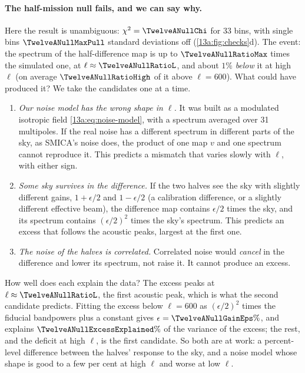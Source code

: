 \paragraph{The half-mission null fails, and we can say why.} Here the result is unambiguous: $\chi^2=\TwelveANullChi$
for $33$ bins, with single bins $\TwelveANullMaxPull$ standard deviations off (\cref{13a:fig:checks}d). The event: the
spectrum of the half-difference map is up to $\TwelveANullRatioMax$ times the simulated one, at $\ell\approx\TwelveANullRatioL$,
and about $1\%$ \emph{below} it at high $\ell$ (on average $\TwelveANullRatioHigh$ of it above $\ell=600$). What could have
produced it? We take the candidates one at a time.
\begin{enumerate}[itemsep=2pt,leftmargin=1.5em]
  \item \emph{Our noise model has the wrong shape in $\ell$.} It was built as a modulated isotropic field
        \eqref{13a:eq:noise-model}, with a spectrum averaged over 31 multipoles. If the real noise has a different spectrum in
        different parts of the sky, as SMICA's noise does, the product of one map $v$ and one spectrum cannot reproduce it.
        This predicts a mismatch that varies slowly with $\ell$, with either sign.
  \item \emph{Some sky survives in the difference.} If the two halves see the sky with slightly different gains, $1+\epsilon/2$
        and $1-\epsilon/2$ (a calibration difference, or a slightly different effective beam), the difference map contains
        $\epsilon/2$ times the sky, and its spectrum contains $(\epsilon/2)^2$ times the sky's spectrum. This predicts an excess
        that follows the acoustic peaks, largest at the first one.
  \item \emph{The noise of the halves is correlated.} Correlated noise would \emph{cancel} in the difference and lower its
        spectrum, not raise it. It cannot produce an excess.
\end{enumerate}
How well does each explain the data? The excess peaks at $\ell\approx\TwelveANullRatioL$, the first acoustic peak, which is what
the second candidate predicts. Fitting the excess below $\ell=600$ as $(\epsilon/2)^2$ times the fiducial bandpowers plus a constant
gives $\epsilon=\TwelveANullGainEps\%$, and explains $\TwelveANullExcessExplained\%$ of the variance of the excess; the rest, and the
deficit at high $\ell$, is the first candidate. So both are at work: a percent-level difference between the halves' response to
the sky, and a noise model whose shape is good to a few per cent at high $\ell$ and worse at low $\ell$.


